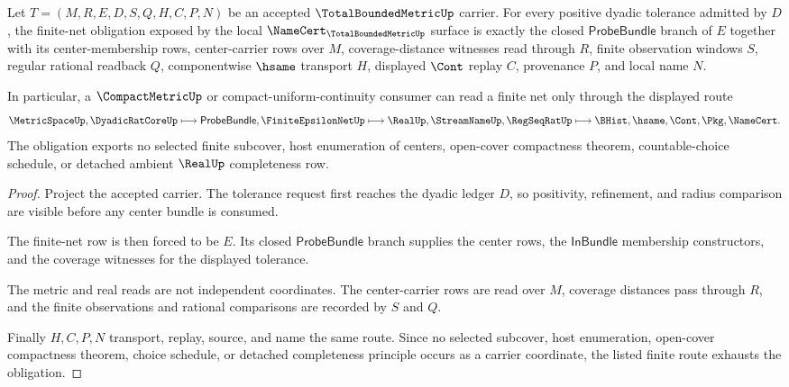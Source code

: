 \begin{theorem}
\label{thm:total-bounded-metric-finite-net-obligation}
Let $T=(M,R,E,D,S,Q,H,C,P,N)$ be an accepted $\TotalBoundedMetricUp$ carrier. For every positive dyadic tolerance admitted by $D$, the finite-net obligation exposed by the local $\NameCert_{\TotalBoundedMetricUp}$ surface is exactly the closed $\mathsf{ProbeBundle}$ branch of $E$ together with its center-membership rows, center-carrier rows over $M$, coverage-distance witnesses read through $R$, finite observation windows $S$, regular rational readback $Q$, componentwise $\hsame$ transport $H$, displayed $\Cont$ replay $C$, provenance $P$, and local name $N$.

In particular, a $\CompactMetricUp$ or compact-uniform-continuity consumer can read a finite net only through the displayed route
$$
\MetricSpaceUp,\DyadicRatCoreUp
\longmapsto
\mathsf{ProbeBundle},\FiniteEpsilonNetUp
\longmapsto
\RealUp,\StreamNameUp,\RegSeqRatUp
\longmapsto
\BHist,\hsame,\Cont,\Pkg,\NameCert .
$$
The obligation exports no selected finite subcover, host enumeration of centers, open-cover compactness theorem, countable-choice schedule, or detached ambient $\RealUp$ completeness row.
\end{theorem}
\begin{proof}
Project the accepted carrier. The tolerance request first reaches the dyadic ledger $D$, so positivity, refinement, and radius comparison are visible before any center bundle is consumed.

The finite-net row is then forced to be $E$. Its closed $\mathsf{ProbeBundle}$ branch supplies the center rows, the $\mathsf{InBundle}$ membership constructors, and the coverage witnesses for the displayed tolerance.

The metric and real reads are not independent coordinates. The center-carrier rows are read over $M$, coverage distances pass through $R$, and the finite observations and rational comparisons are recorded by $S$ and $Q$.

Finally $H,C,P,N$ transport, replay, source, and name the same route. Since no selected subcover, host enumeration, open-cover compactness theorem, choice schedule, or detached completeness principle occurs as a carrier coordinate, the listed finite route exhausts the obligation.
\end{proof}

